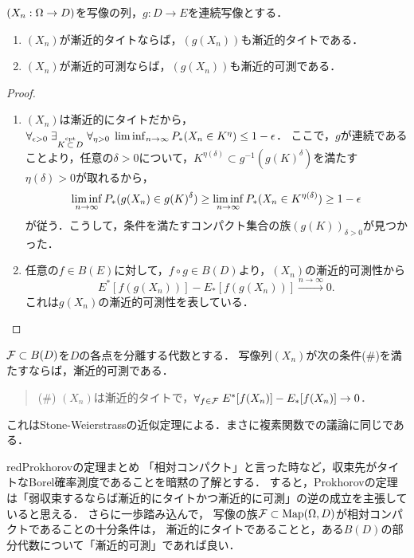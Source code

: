 \documentclass[uplatex,dvipdfmx]{jsreport}
\begin{document}
\begin{proposition}[連続写像は漸近的性質を保つ]\label{prop-continous-functions-preserve-asymptotical-properties}
    $(X_n:\Omega\to D)$を写像の列，$g:D\to E$を連続写像とする．
    \begin{enumerate}
        \item $(X_n)$が漸近的タイトならば，$(g(X_n))$も漸近的タイトである．
        \item $(X_n)$が漸近的可測ならば，$(g(X_n))$も漸近的可測である．
    \end{enumerate}
\end{proposition}
\begin{proof}\mbox{}
    \begin{enumerate}
        \item $(X_n)$は漸近的にタイトだから，$\forall_{\epsilon>0}\;\exists_{K\overset{\textrm{cpt}}{\subset} D}\;\forall_{\eta>0}\;\liminf_{n\to\infty} P_*(X_n\in K^\eta)\le 1-\epsilon$．
        ここで，$g$が連続であることより，任意の$\delta>0$について，$K^{\eta(\delta)}\subset g^{-1}(g(K)^\delta)$を満たす$\eta(\delta)>0$が取れるから，
        \[\liminf_{n\to\infty} P_*(g(X_n)\in g(K)^\delta)\ge\liminf_{n\to\infty} P_*(X_n\in K^{\eta(\delta)})\ge 1-\epsilon\]
        が従う．こうして，条件を満たすコンパクト集合の族$(g(K))_{\delta>0}$が見つかった．
        \item 任意の$f\in B(E)$に対して，$f\circ g\in B(D)$より，$(X_n)$の漸近的可測性から
        \[E^*[f(g(X_n))]-E_*[f(g(X_n))]\xrightarrow{n\to\infty}0.\]
        これは$g(X_n)$の漸近的可測性を表している．
    \end{enumerate}
\end{proof}

\begin{lemma}[漸近的可測性の十分条件]\label{lemma-characterization-of-asymptotical-measurability}
    $\mathcal{F}\subset B(D)$を$D$の各点を分離する代数とする．
    写像列$(X_n)$が次の条件(\#)を満たすならば，漸近的可測である．
    \begin{quote}
        (\#) $(X_n)$は漸近的タイトで，$\forall_{f\in\mathcal{F}}\;E^*[f(X_n)]-E_*[f(X_n)]\to 0$．
    \end{quote}
\end{lemma}
\begin{remarks}
    これはStone-Weierstrassの近似定理による．まさに複素関数での議論に同じである．
\end{remarks}

\begin{tbox}{red}{Prokhorovの定理まとめ}
    「相対コンパクト」と言った時など，収束先がタイトなBorel確率測度であることを暗黙の了解とする．
    すると，Prokhorovの定理は「弱収束するならば漸近的にタイトかつ漸近的に可測」の逆の成立を主張していると思える．
    さらに一歩踏み込んで，
    写像の族$\mathcal{F}\subset\mathrm{Map}(\Omega,D)$が相対コンパクトであることの十分条件は，
    漸近的にタイトであることと，ある$B(D)$の部分代数について「漸近的可測」であれば良い．
\end{tbox}
\end{document}
